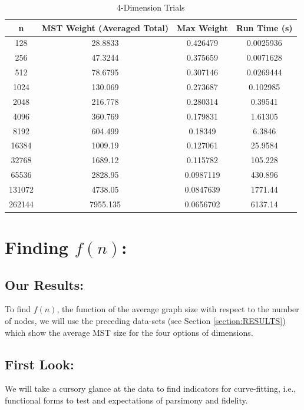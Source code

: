 \documentclass[conference]{styles/acmsiggraph}
\newcommand{\?}{\stackrel{?}{=}}
\begin{document}
\begin{table}[htbp]
  \centering
  \caption{4-Dimension Trials}
    \begin{tabular}{cccc}
    \toprule
    \textbf{n} & \textbf{MST Weight (Averaged Total)} & \textbf{Max Weight} & \textbf{Run Time (s)} \\
    \midrule
    128   & 28.8833 & 0.426479 & 0.0025936 \\
    256   & 47.3244 & 0.375659 & 0.0071628 \\
    512   & 78.6795 & 0.307146 & 0.0269444 \\
    1024  & 130.069 & 0.273687 & 0.102985 \\
    2048  & 216.778 & 0.280314 & 0.39541 \\
    4096  & 360.769 & 0.179831 & 1.61305 \\
    8192  & 604.499 & 0.18349 & 6.3846 \\
    16384 & 1009.19 & 0.127061 & 25.9584 \\
    32768 & 1689.12 & 0.115782 & 105.228 \\
    65536 & 2828.95 & 0.0987119 & 430.896 \\
    131072 & 4738.05 & 0.0847639 & 1771.44 \\
    262144 & 7955.135 & 0.0656702 & 6137.14 \\
    \bottomrule
    \end{tabular}%
  \label{tab:addlabel}%
\end{table}%
\FloatBarrier


\section{Finding $f(n)$:}
\subsection{Our Results:}
To find $f(n)$, the function of the average graph size with respect to the number of nodes, we will use the preceding data-sets (see Section \ref{section:RESULTS}) which show the average MST size for the four options of dimensions.  

\subsection{First Look:}
We will take a cursory glance at the data to find indicators for curve-fitting, i.e., functional forms to test and expectations of parsimony and fidelity.  
\end{document}
